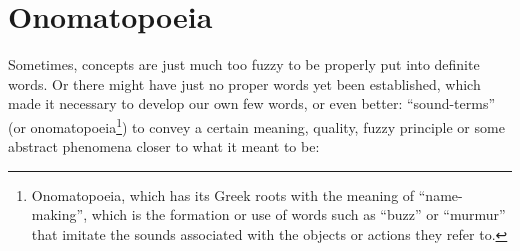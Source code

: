 \section{Onomatopoeia}\label{sec:onomatopoeia}

Sometimes, concepts are just much too fuzzy to be properly put into definite words.
Or there might have just no proper words yet been established, which made it necessary to develop our own few words, or even better: ``sound-terms'' (or onomatopoeia\footnote{Onomatopoeia, which has its Greek roots with the meaning of ``name-making'', which is the formation or use of words such as ``buzz'' or ``murmur'' that imitate the sounds associated with the objects or actions they refer to.}) to convey a certain meaning, quality, fuzzy principle or some abstract phenomena closer to what it meant to be:

